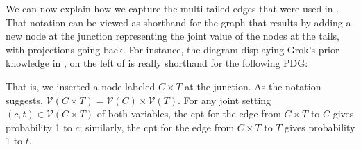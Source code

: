 \documentclass{article}
\newcommand{\V}{\mathcal V}
\newcommand{\MN}{PDG}
\numberwithin{equation}{section}
\begin{document}
        We can now explain how we capture   the multi-tailed edges that 
        were used in 
. 
That notation can be viewed as shorthand for the graph that results by adding a new node at the junction representing the joint value of the nodes at the tails, with projections going back.  For instance,
the diagram displaying Grok's prior knowledge in , on the left of 
is really shorthand for the following \MN:
	\begin{center}
% 
% 
% 
	\end{center}
That is, we inserted a node labeled $C \times T$ at the junction.  As
the notation suggests, $\V( C \times T) = \V(C) \times \V(T)$.
For any joint setting $(c,t) \in \V(C \times T)$ of both variables, the cpt for
the edge from $C \times T$ to $C$ gives probability 1 to $c$;
similarly, the cpt for the edge from $ C \times T$ to $T$ gives probability 1 to $t$.
\end{document}
